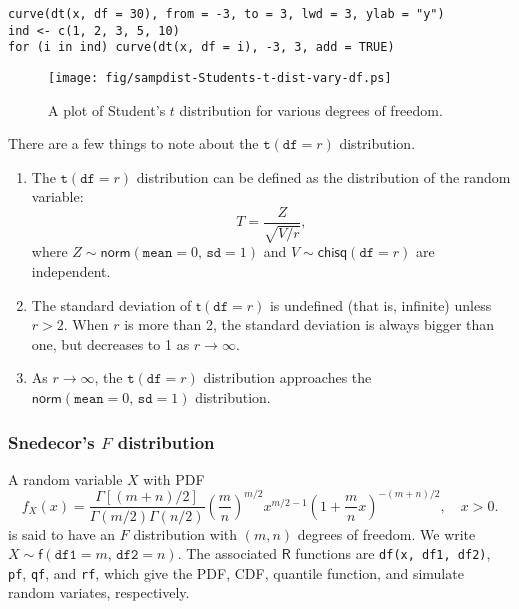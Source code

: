 \begin{Verbatim}
curve(dt(x, df = 30), from = -3, to = 3, lwd = 3, ylab = "y")
ind <- c(1, 2, 3, 5, 10)
for (i in ind) curve(dt(x, df = i), -3, 3, add = TRUE)
\end{Verbatim}

\begin{figure}[ht!]
\centering
\texttt{[image: fig/sampdist-Students-t-dist-vary-df.ps]}
\caption[Student's \(t\) distribution for various degrees of freedom]
{
\label{fig-Students-t-dist-vary-df}
\small
A plot of Student's \(t\) distribution for various degrees of freedom.
}
\end{figure}

\begin{rem}
There are a few things to note about the \(\mathtt{t}(\mathtt{df}=r)\) distribution.
\begin{enumerate}
\item
The \(\mathtt{t}(\mathtt{df}=r)\) distribution can be defined as the distribution of the random variable:
\[ T=\frac{Z}{\sqrt{V/r}}, \]
where $Z\sim\mathsf{norm}(\mathtt{mean}=0,\,\mathtt{sd}=1)$ and $V\sim\mathsf{chisq}(\mathtt{df}=r)$ are independent.
\item
The standard deviation of \(\mathsf{t}(\mathtt{df}=r)\) is undefined (that is, infinite) unless \(r>2\).
When \(r\) is more than 2, the standard deviation is always bigger than one, but decreases to 1 as \(r\to\infty\).
\item
As \(r\to\infty\), the \(\mathtt{t}(\mathtt{df}=r)\) distribution approaches the \(\mathsf{norm}(\mathtt{mean}=0,\,\mathtt{sd}=1)\) distribution.
\end{enumerate}
\end{rem}

\subsubsection{Snedecor's \(F\) distribution}
\label{sec-6-5-2-3}

A random variable \(X\) with PDF
\begin{equation}
f_{X}(x)=\frac{\Gamma[(m+n)/2]}{\Gamma(m/2)\Gamma(n/2)}\left(\frac{m}{n}\right)^{m/2}x^{m/2-1}\left(1+\frac{m}{n}x\right)^{-(m+n)/2},\quad x>0.
\end{equation}
is said to have an \(F\) distribution with \((m,n)\) degrees of
freedom. We write
\(X\sim\mathsf{f}(\mathtt{df1}=m,\,\mathtt{df2}=n)\). The associated
\(\mathsf{R}\) functions are \texttt{df(x, df1, df2)}, \texttt{pf}, \texttt{qf}, and \texttt{rf},
which give the PDF, CDF, quantile function, and simulate random
variates, respectively.

